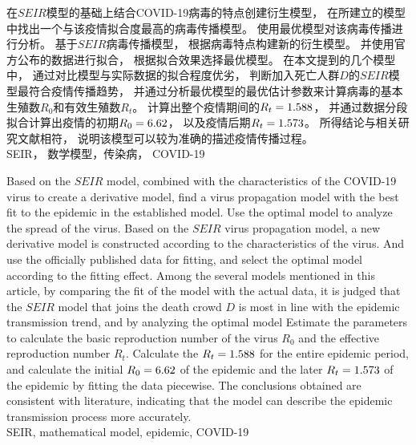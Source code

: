 \begin{cnabstract}
    \songti {}
    在$SEIR$模型的基础上结合COVID-19病毒的特点创建衍生模型，
    在所建立的模型中找出一个与该疫情拟合度最高的病毒传播模型。
    使用最优模型对该病毒传播进行分析。
    基于$SEIR$病毒传播模型，
    根据病毒特点构建新的衍生模型。
    并使用官方公布的数据进行拟合，
    根据拟合效果选择最优模型。
    在本文提到的几个模型中，
    通过对比模型与实际数据的拟合程度优劣，
    判断加入死亡人群$D$的$SEIR$模型最符合疫情传播趋势，
    并通过分析最优模型的最优估计参数来计算病毒的基本生殖数$R_0$和有效生殖数$R_t$。
    计算出整个疫情期间的$R_t=1.588$，
    并通过数据分段拟合计算出疫情的初期$R_0=6.62$，
    以及疫情后期$R_t=1.573$。
    所得结论与相关研究文献相符，
    说明该模型可以较为准确的描述疫情传播过程。
    \\
     SEIR， 数学模型，传染病， COVID-19
\end{cnabstract}
\begin{enabstract}
    Based on the $ SEIR $ model,
    combined with the characteristics of the COVID-19 virus to create a derivative model,
    find a virus propagation model with the best fit to the epidemic in the established model.
    Use the optimal model to analyze the spread of the virus.
    Based on the $ SEIR $ virus propagation model,
    a new derivative model is constructed according to the characteristics of the virus.
    And use the officially published data for fitting,
    and select the optimal model according to the fitting effect.
    Among the several models mentioned in this article,
    by comparing the fit of the model with the actual data,
    it is judged that the $ SEIR $ model that joins the death crowd $ D $ is most in line with the epidemic transmission trend,
    and by analyzing the optimal model Estimate the parameters to calculate the basic reproduction number of the virus $ R_0 $ and the effective reproduction number $ R_t $.
    Calculate the $ R_t = 1.588 $ for the entire epidemic period,
    and calculate the initial $ R_0 = 6.62 $ of the epidemic and the later $ R_t = 1.573 $ of the epidemic by fitting the data piecewise.
    The conclusions obtained are consistent with literature,
    indicating that the model can describe the epidemic transmission process more accurately.
    \\
     SEIR, mathematical model, epidemic, COVID-19
\end{enabstract}